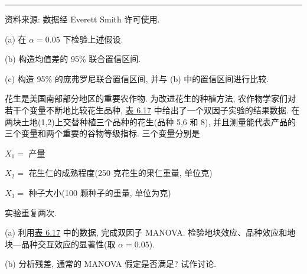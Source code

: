 \vspace{2pt}
\noindent\rule{\linewidth}{0.4pt}

\noindent\small 资料来源: 数据经 Everett Smith 许可使用.

\vspace{1em}
\noindent (a) 在 $\alpha=0.05$ 下检验上述假设.

\noindent (b) 构造均值差的 95\% 联合置信区间.

\noindent (c) 构造 95\% 的庞弗罗尼联合置信区间, 并与 (b) 中的置信区间进行比较.

\quad 花生是美国南部部分地区的重要农作物. 为改进花生的种植方法, 农作物学家们对若干个变量不断地比较花生品种, \hyperref[tab:6.17]{表 6.17} 中给出了一个双因子实验的结果数据. 在两块土地(1,2)上交替种植三个品种的花生(品种 5,6 和 8), 并且测量能代表产品的三个变量和两个重要的谷物等级指标. 三个变量分别是

\noindent $X_1=$ 产量

\noindent $X_2=$ 花生仁的成熟程度(250 克花生的果仁重量, 单位克)

\noindent $X_3=$ 种子大小(100 颗种子的重量, 单位为克)

\noindent 实验重复两次.

\noindent (a) 利用\hyperref[tab:6.17]{表 6.17} 中的数据, 完成双因子 MANOVA. 检验地块效应、品种效应和地块—品种交互效应的显著性(取 $\alpha=0.05$).

\noindent (b) 分析残差, 通常的 MANOVA 假定是否满足? 试作讨论.

